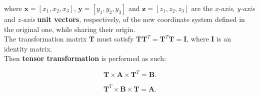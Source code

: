 \documentclass[10pt,b5paper,titlepage]{book}
\begin{document}
where $\mathbf{x} = [x_1, x_2, x_3]$, $\mathbf{y} = [y_1, y_2, y_3]$ and
$\mathbf{z} = [z_1, z_2, z_3]$ are the \textit{x-axis}, \textit{y-axis} and
\textit{z-axis} \textbf{unit vectors}, respectively, of the new coordinate
system defined in the original one, while sharing their origin.\\

The transformation matrix $\mathbf{T}$ must satisfy
$\mathbf{T}\mathbf{T}^{T} = \mathbf{T}^{T}\mathbf{T} = \mathbf{I}$, where $\mathbf{I}$
is an identity matrix.\\

Then \textbf{tensor transformation} is performed as such:

\begin{equation}
    \mathbf{T} \times \mathbf{A} \times \mathbf{T}^{T} = \mathbf{B}
.\end{equation}

\begin{equation}
    \mathbf{T}^{T} \times \mathbf{B} \times \mathbf{T} = \mathbf{A}
.\end{equation}
\end{document}
